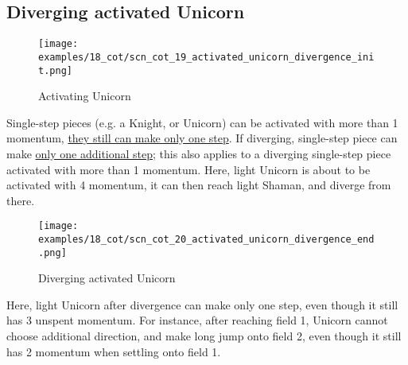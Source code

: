 \clearpage %

\subsection*{Diverging activated Unicorn}
\label{sec:Conquest of Tlalocan/Divergence/Diverging activated Unicorn}

\vspace*{-1.4\baselineskip}
\noindent
\begin{figure}[!h]
\texttt{[image: examples/18\_cot/scn\_cot\_19\_activated\_unicorn\_divergence\_init.png]}
\vspace*{-1.3\baselineskip}
\caption{Activating Unicorn}
\label{fig:scn_cot_19_activated_unicorn_divergence_init}
\end{figure}

\vspace*{-0.5\baselineskip}
Single-step pieces (e.g. a Knight, or Unicorn) can be activated with more than 1 momentum,
\hyperref[fig:scn_mv_30_single_step_piece_momentum]{they still can make only one step}.
If diverging, single-step piece can make
\hyperref[fig:scn_cot_16_diverging_unicorn_init]{only one additional step}; this also
applies to a diverging single-step piece activated with more than 1 momentum. \newline
\indent
Here, light Unicorn is about to be activated with 4 momentum, it can then reach light
Shaman, and diverge from there.

\clearpage %

\vspace*{-2.1\baselineskip}
\noindent
\begin{figure}[!h]
\texttt{[image: examples/18\_cot/scn\_cot\_20\_activated\_unicorn\_divergence\_end.png]}
\vspace*{-1.3\baselineskip}
\caption{Diverging activated Unicorn}
\label{fig:scn_cot_20_activated_unicorn_divergence_end}
\end{figure}

\vspace*{-0.4\baselineskip}
Here, light Unicorn after divergence can make only one step, even though it still
has 3 unspent momentum. For instance, after reaching field 1, Unicorn cannot choose
additional direction, and make long jump onto field 2, even though it still has 2
momentum when settling onto field 1.


